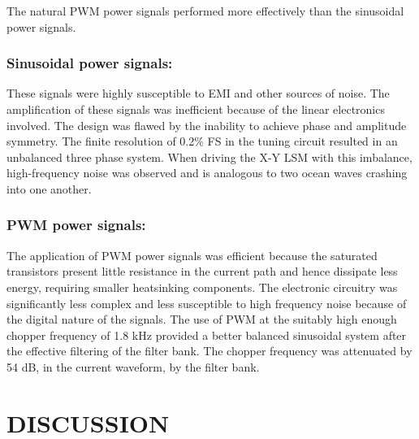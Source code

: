 \documentclass[10pt,twocolumn]{witseiepaper}
\begin{document}
The natural PWM power signals performed more effectively than the sinusoidal
power signals.

\subsubsection*{Sinusoidal power signals:}
These signals were highly susceptible to EMI and other sources of noise.  The
amplification of these signals was inefficient because of the linear
electronics involved.  The design was flawed by the inability to achieve phase
and amplitude symmetry.  The finite resolution of 0.2\% FS in the tuning
circuit resulted in an unbalanced three phase system.  When driving the X-Y
LSM with this imbalance, high-frequency noise was observed and is analogous to
two ocean waves crashing into one another.  

\subsubsection*{PWM power signals:}
The application of PWM power signals was efficient because the saturated
transistors present little resistance in the current path and hence dissipate
less energy, requiring smaller heatsinking components.  The electronic
circuitry was significantly less complex and less susceptible to high
frequency noise because of the digital nature of the signals.  The use of PWM
at the suitably high enough chopper frequency of 1.8 kHz provided a better
balanced sinusoidal system after the effective filtering of the filter bank.
The chopper frequency was attenuated by 54 dB, in the current waveform, by the
filter bank.

\section{DISCUSSION}
\end{document}
